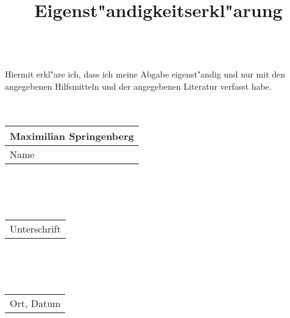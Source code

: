\documentclass{article}
\title{Eigenst"andigkeitserkl"arung}
\date{}
\begin{document}
\maketitle
\ \\
Hiermit erkl"are ich, dass ich meine Abgabe eigenst"andig und nur mit den 
angegebenen Hilfsmitteln und der angegebenen Literatur verfasst habe.\\
\\
\\
\begin{tabular}{L{10cm}}
    Maximilian Springenberg\\
    \hline
    Name\\
\end{tabular}\\
\\
\\
\begin{tabular}{L{10cm}}
    \\
    \hline
    Unterschrift\\
\end{tabular}\\
\\
\\
\begin{tabular}{L{6cm}}
    \\
    \hline
    Ort, Datum\\
\end{tabular}
\end{document}
